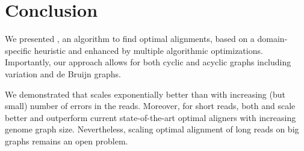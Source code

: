\section{Conclusion}
We presented \astarix, an \A algorithm to find optimal alignments, based on a
domain-specific heuristic and enhanced by multiple algorithmic optimizations.
Importantly, our approach allows for both cyclic and acyclic graphs including
variation and de Bruijn graphs.

We demonstrated that \astarix scales exponentially better than \dijkstra with
increasing (but small) number of errors in the reads. Moreover, for short reads,
both \astarix and \dijkstra scale better and outperform current state-of-the-art
optimal aligners with increasing genome graph size. Nevertheless, scaling
optimal alignment of long reads on big graphs remains an open problem.